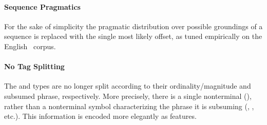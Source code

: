 \paragraph{Sequence Pragmatics}
For the sake of simplicity the pragmatic distribution over
  possible groundings of a sequence is replaced with the single most likely
  offset, as tuned empirically on the English \tempeval\ corpus.

\paragraph{No Tag Splitting}
The  and  types are no longer split according to their
  ordinality/magnitude and subsumed phrase, respectively.
More precisely, there is a single nonterminal (), rather than
  a nonterminal symbol characterizing the phrase it is subsuming
  (, , etc.).
This information is encoded more elegantly as features.

